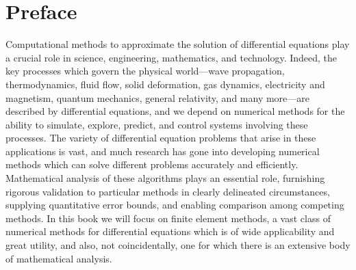 \section*{{Preface}}\label{sec:preface}

{Computational methods to approximate the solution of differential equations play a crucial role in science, engineering, mathematics, and technology. Indeed, the key processes which govern the physical world---wave propagation, thermodynamics, fluid flow, solid deformation, gas dynamics, electricity and magnetism, quantum mechanics, general relativity, and many more---are described by differential equations, and we depend on numerical methods for the ability to simulate, explore, predict, and control systems involving these processes. The variety of differential equation problems that arise in these applications is vast, and much research has gone into developing numerical methods which can solve different problems accurately and efficiently. Mathematical analysis of these algorithms plays an essential role, furnishing rigorous validation to particular methods in clearly delineated circumstances, supplying quantitative error bounds, and enabling comparison among competing methods. In this book we will focus on finite element methods, a vast class of numerical methods for differential equations which is of wide applicability and great utility, and also, not coincidentally, one for which there is an extensive body of mathematical analysis.}

